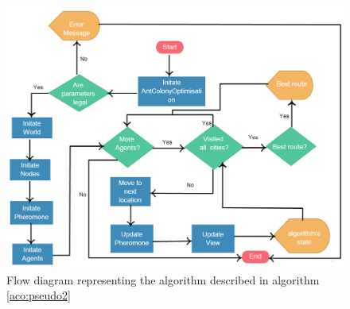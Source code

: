 \begin{figure}
\includegraphics[scale=0.45]{Images/chapter4/overallflow}
\caption[Basic Ant System Flow Diagram]{Flow diagram representing the algorithm described in algorithm \ref{aco:pseudo2}}
\label{fig:overallFlow}
\end{figure}

